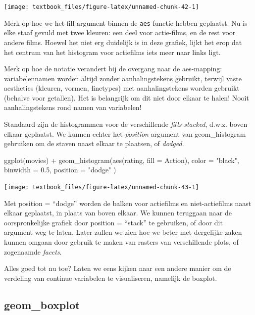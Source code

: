 \documentclass[]{tufte-book}
\newenvironment{Shaded}{}{}
\newcommand{\AttributeTok}[1]{\textcolor[rgb]{0.49,0.56,0.16}{#1}}
\newcommand{\FloatTok}[1]{\textcolor[rgb]{0.25,0.63,0.44}{#1}}
\newcommand{\FunctionTok}[1]{\textcolor[rgb]{0.02,0.16,0.49}{#1}}
\newcommand{\NormalTok}[1]{#1}
\newcommand{\SpecialCharTok}[1]{\textcolor[rgb]{0.25,0.44,0.63}{#1}}
\newcommand{\StringTok}[1]{\textcolor[rgb]{0.25,0.44,0.63}{#1}}
\begin{document}
\texttt{[image: textbook\_files/figure-latex/unnamed-chunk-42-1]}

Merk op hoe we het fill-argument binnen de \texttt{aes} functie hebben geplaatst. Nu is elke staaf gevuld met twee kleuren: een deel voor actie-films, en de rest voor andere films. Hoewel het niet erg duidelijk is in deze grafiek, lijkt het erop dat het centrum van het histogram voor actiefilms iets meer naar links ligt.

Merk op hoe de notatie verandert bij de overgang naar de aes-mapping: variabelennamen worden altijd zonder aanhalingstekens gebruikt, terwijl vaste aesthetics (kleuren, vormen, linetypes) met aanhalingstekens worden gebruikt (behalve voor getallen). Het is belangrijk om dit niet door elkaar te halen! Nooit aanhalingstekens rond namen van variabelen!

Standaard zijn de histogrammen voor de verschillende \emph{fills} \emph{stacked}, d.w.z. boven elkaar geplaatst. We kunnen echter het \emph{position} argument van geom\_histogram gebruiken om de staven naast elkaar te plaatsen, of \emph{dodged}.

\begin{Shaded}
\begin{Highlighting}[]
\FunctionTok{ggplot}\NormalTok{(movies) }\SpecialCharTok{+}
  \FunctionTok{geom\_histogram}\NormalTok{(}\FunctionTok{aes}\NormalTok{(rating, }\AttributeTok{fill =}\NormalTok{ Action),}
    \AttributeTok{color =} \StringTok{"black"}\NormalTok{, }\AttributeTok{binwidth =} \FloatTok{0.5}\NormalTok{, }\AttributeTok{position =} \StringTok{"dodge"}
\NormalTok{  )}
\end{Highlighting}
\end{Shaded}

\texttt{[image: textbook\_files/figure-latex/unnamed-chunk-43-1]}

Met position = ``dodge'' worden de balken voor actiefilms en niet-actiefilms naast elkaar geplaatst, in plaats van boven elkaar. We kunnen teruggaan naar de oorspronkelijke grafiek door position = ``stack'' te gebruiken, of door dit argument weg te laten. Later zullen we zien hoe we beter met dergelijke zaken kunnen omgaan door gebruik te maken van rasters van verschillende plots, of zogenaamde \emph{facets}.

Alles goed tot nu toe? Laten we eens kijken naar een andere manier om de verdeling van continue variabelen te visualiseren, namelijk de boxplot.

\hypertarget{geom_boxplot}{%
\subsection{geom\_boxplot}\label{geom_boxplot}}
\end{document}
